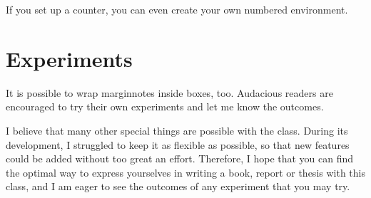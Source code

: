 \begin{kaobox}[frametitle=Title of the box]
\blindtext
\end{kaobox}

If you set up a counter, you can even create your own numbered 
environment.

\begin{kaocounter}
    \blindtext
\end{kaocounter}

\section{Experiments}

It is possible to wrap marginnotes inside boxes, too. Audacious readers 
are encouraged to try their own experiments and let me know the 
outcomes.


I believe that many other special things are possible with the 
 class. During its development, I struggled to keep it as 
flexible as possible, so that new features could be added without too 
great an effort. Therefore, I hope that you can find the optimal way to 
express yourselves in writing a book, report or thesis with this class, 
and I am eager to see the outcomes of any experiment that you may try.

